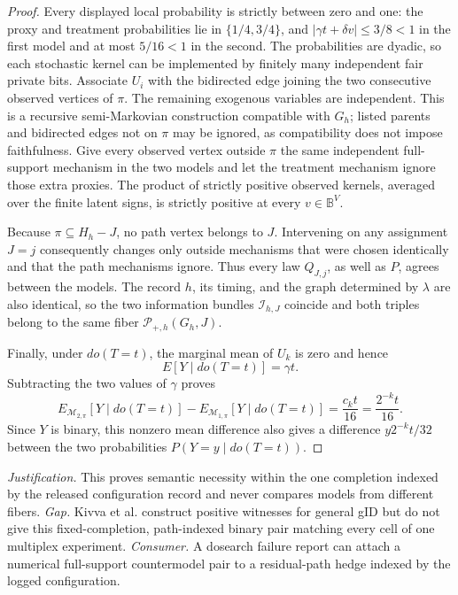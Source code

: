 \documentclass{article}
\begin{document}
\begin{proof}
Every displayed local probability is strictly between zero and one: the proxy and treatment probabilities lie in \(\{1/4,3/4\}\), and \(|\gamma t+\delta v|\le3/8<1\) in the first model and at most \(5/16<1\) in the second.  The probabilities are dyadic, so each stochastic kernel can be implemented by finitely many independent fair private bits.  Associate \(U_i\) with the bidirected edge joining the two consecutive observed vertices of \(\pi\).  The remaining exogenous variables are independent.  This is a recursive semi-Markovian construction compatible with \(G_h\); listed parents and bidirected edges not on \(\pi\) may be ignored, as compatibility does not impose faithfulness.  Give every observed vertex outside \(\pi\) the same independent full-support mechanism in the two models and let the treatment mechanism ignore those extra proxies.  The product of strictly positive observed kernels, averaged over the finite latent signs, is strictly positive at every \(v\in\mathbb B^V\).

Because \(\pi\subseteq H_h-J\), no path vertex belongs to \(J\).  Intervening on any assignment \(J=j\) consequently changes only outside mechanisms that were chosen identically and that the path mechanisms ignore.  Thus every law \(Q_{J,j}\), as well as \(P\), agrees between the models.  The record \(h\), its timing, and the graph determined by \(\lambda\) are also identical, so the two information bundles \(\mathcal I_{h,J}\) coincide and both triples belong to the same fiber \(\mathcal P_{+,h}(G_h,J)\).

Finally, under \(do(T=t)\), the marginal mean of \(U_k\) is zero and hence
\[
 E[Y\mid do(T=t)]=\gamma t.
\]
Subtracting the two values of \(\gamma\) proves
\[
 E_{\mathcal M_{2,\pi}}[Y\mid do(T=t)]-
 E_{\mathcal M_{1,\pi}}[Y\mid do(T=t)]
 =\frac{c_kt}{16}=\frac{2^{-k}t}{16}.
\]
Since \(Y\) is binary, this nonzero mean difference also gives a difference \(y2^{-k}t/32\) between the two probabilities \(P(Y=y\mid do(T=t))\).
\end{proof}
\par\smallskip\noindent \textit{Justification.} This proves semantic necessity within the one completion indexed by the released configuration record and never compares models from different fibers. \textit{Gap.} Kivva et al. construct positive witnesses for general gID but do not give this fixed-completion, path-indexed binary pair matching every cell of one multiplex experiment. \textit{Consumer.} A dosearch failure report can attach a numerical full-support countermodel pair to a residual-path hedge indexed by the logged configuration.
\end{document}
